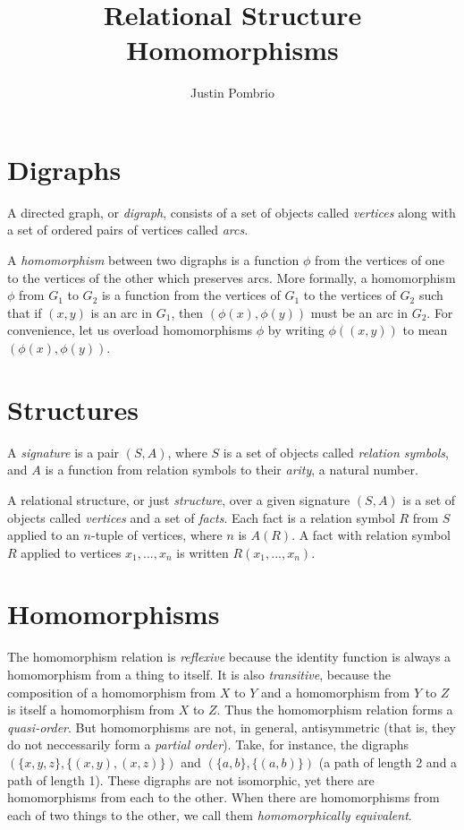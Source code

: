 \documentclass{article}
\newcommand{\term}{\emph}
\begin{document}
\title{Relational Structure Homomorphisms}
\author{Justin Pombrio}
\maketitle


\section{Digraphs}
  A directed graph, or \term{digraph}, consists of a set of objects
  called \term{vertices} along with a set of ordered pairs of vertices
  called \term{arcs}.

  A \term{homomorphism} between two digraphs is a function $\phi$ from
  the vertices of one to the vertices of the other which preserves
  arcs.  More formally, a homomorphism $\phi$ from $G_1$ to $G_2$ is a
  function from the vertices of $G_1$ to the vertices of $G_2$ such
  that if $(x, y)$ is an arc in $G_1$, then $(\phi(x), \phi(y))$ must
  be an arc in $G_2$.  For convenience, let us overload homomorphisms
  $\phi$ by writing $\phi((x, y))$ to mean $(\phi(x), \phi(y))$.

\section{Structures}
  A \term{signature} is a pair $(S, A)$, where $S$ is a set of objects
  called \term{relation symbols}, and $A$ is a function from relation
  symbols to their \term{arity}, a natural number.

  A relational structure, or just \term{structure}, over a given
  signature $(S, A)$ is a set of objects called \term{vertices} and a set
  of \term{facts}.  Each fact is a relation symbol $R$ from $S$ applied
  to an $n$-tuple of vertices, where $n$ is $A(R)$.  A fact with
  relation symbol $R$ applied to vertices $x_1, ..., x_n$ is written
  $R(x_1, ..., x_n)$.

\section{Homomorphisms}
  The homomorphism relation is \emph{reflexive} because the identity
  function is always a homomorphism from a thing to itself.  It is
  also \emph{transitive}, because the composition of a homomorphism
  from $X$ to $Y$ and a homomorphism from $Y$ to $Z$ is itself a
  homomorphism from $X$ to $Z$.  Thus the homomorphism relation forms
  a \emph{quasi-order}.  But homomorphisms are not, in general,
  antisymmetric (that is, they do not neccessarily form a
  \emph{partial order}).  Take, for instance, the digraphs $(\{x, y,
  z\}, \{(x, y), (x, z)\})$ and $(\{a, b\}, \{(a, b)\})$ (a path of
  length 2 and a path of length 1).  These digraphs are not
  isomorphic, yet there are homomorphisms from each to the other.
  When there are homomorphisms from each of two things to the other,
  we call them \term{homomorphically equivalent}.
\end{document}
